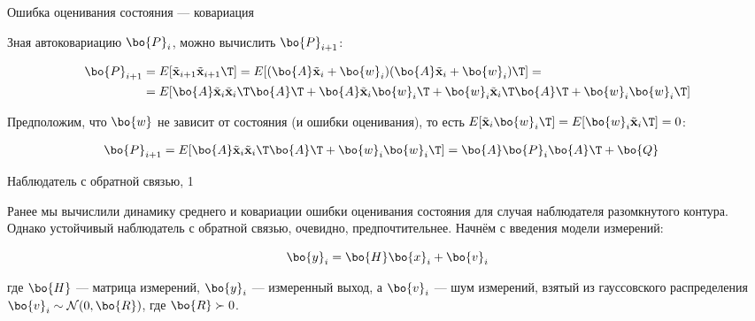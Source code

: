 \documentclass{beamer}
\newcommand{\btil}[1] {\Tilde{\mathbf{#1}}}
\begin{document}
\begin{frame}{Ошибка оценивания состояния — ковариация}
	\begin{flushleft}
		
		Зная автоковариацию $\bo{P}_i$, можно вычислить $\bo{P}_{i+1}$:
		
		\begin{align*}
			\bo{P}_{i+1} &= E[\btil{x}_{i+1}\btil{x}_{i+1}\T] = 
			E[(\bo{A} \btil{x}_i + \bo{w}_i) (\bo{A} \btil{x}_i + \bo{w}_i)\T] = 
			\\
			&=
			E[\bo{A} \btil{x}_i \btil{x}_i\T \bo{A}\T +
			\bo{A} \btil{x}_i \bo{w}_i\T + 
			\bo{w}_i \btil{x}_i\T \bo{A}\T +
			\bo{w}_i \bo{w}_i\T]
		\end{align*}
		
		Предположим, что $\bo{w}$ не зависит от состояния (и ошибки оценивания), то есть $E[\btil{x}_i \bo{w}_i\T] = E[\bo{w}_i \btil{x}_i\T] = 0$:
		
		\begin{align*}
			\bo{P}_{i+1} 
			&=
			E[\bo{A} \btil{x}_i \btil{x}_i\T \bo{A}\T +
			\bo{w}_i \bo{w}_i\T] 
			= 
			\bo{A} \bo{P}_i \bo{A}\T +
			\bo{Q}
		\end{align*}
		
		
	\end{flushleft}
\end{frame}



\begin{frame}{Наблюдатель с обратной связью, 1}
	\begin{flushleft}
		
		Ранее мы вычислили динамику среднего и ковариации ошибки оценивания состояния для случая наблюдателя разомкнутого контура. Однако устойчивый наблюдатель с обратной связью, очевидно, предпочтительнее. Начнём с введения модели измерений:
		
		\begin{equation}
			\bo{y}_i = \bo{H} \bo{x}_i + \bo{v}_i
		\end{equation}
		
		где $\bo{H}$ — матрица измерений, $\bo{y}_i$ — измеренный выход, а $\bo{v}_i$ — шум измерений, взятый из гауссовского распределения $\bo{v}_i \sim \mathcal{N} (0, \bo{R})$, где $\bo{R} \succ 0$.
		
	\end{flushleft}
\end{frame}
\end{document}
